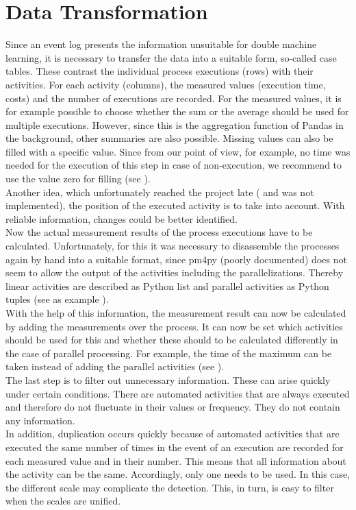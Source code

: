     \section{Data Transformation}
    Since an event log presents the information unsuitable for double machine learning, it is necessary to transfer the data into a suitable form, so-called case tables. These contrast the individual process executions (rows) with their activities. For each activity (columns), the measured values (execution time, costs) and the number of executions are recorded. For the measured values, it is for example possible to choose whether the sum or the average should be used for multiple executions. However, since this is the aggregation function of Pandas in the background, other summaries are also possible. Missing values can also be filled with a specific value. Since from our point of view, for example, no time was needed for the execution of this step in case of non-execution, we recommend to use the value zero for filling (see ).\\
    Another idea, which unfortunately reached the project late ( and was not implemented), the position of the executed activity is to take into account. With reliable information, changes could be better identified.\\
    Now the actual measurement results of the process executions have to be calculated. Unfortunately, for this it was necessary to disassemble the processes again by hand into a suitable format, since pm4py (poorly documented) does not seem to allow the output of the activities including the parallelizations. Thereby linear activities are described as Python list and parallel activities as Python tuples (see as example ).\\
    With the help of this information, the measurement result can now be calculated by adding the measurements over the process. It can now be set which activities should be used for this and whether these should to be calculated differently in the case of parallel processing. For example, the time of the maximum can be taken instead of adding the parallel activities (see ).\\
    The last step is to filter out unnecessary information. These can arise quickly under certain conditions. There are automated activities that are always executed and therefore do not fluctuate in their values or frequency. They do not contain any information.\\
    In addition, duplication occurs quickly because of automated activities that are executed the same number of times in the event of an execution are recorded for each measured value and in their number. This means that all information about the activity can be the same. Accordingly, only one needs to be used. In this case, the different scale may complicate the detection. This, in turn, is easy to filter when the scales are unified.\\
